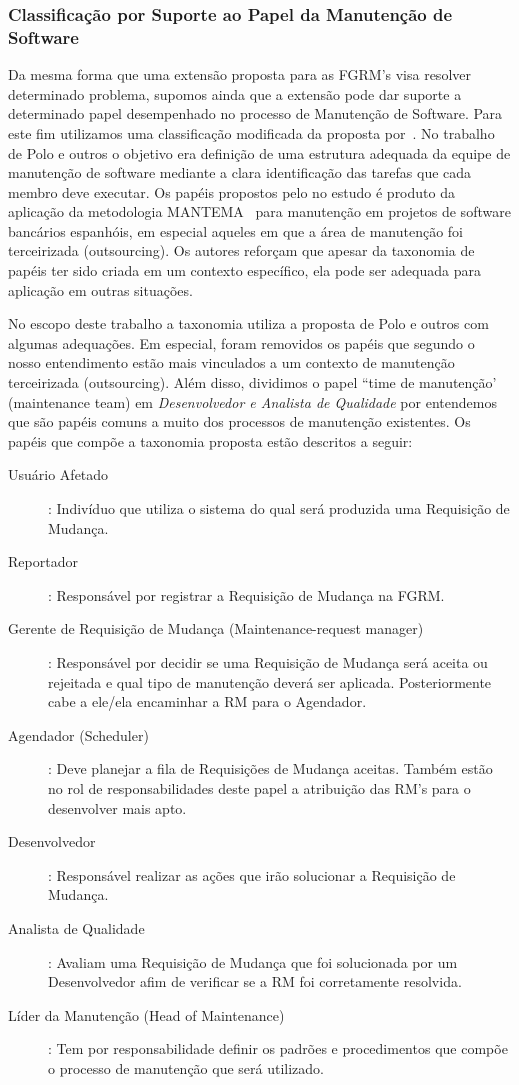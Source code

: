 \subsubsection{Classificação por Suporte ao Papel da Manutenção de Software}
\label{subsubsec:map-esquema-suporte-papel-man}

Da mesma forma que uma extensão proposta para as FGRM's visa resolver
determinado problema, supomos ainda que a extensão pode dar suporte a
determinado papel desempenhado no processo de Manutenção de Software. Para este
fim utilizamos uma classificação modificada da proposta por~\cite{Polo1999}. No
trabalho de Polo e outros o objetivo era definição de uma estrutura adequada da
equipe de manutenção de software mediante a clara identificação das tarefas que
cada membro deve executar. Os papéis propostos pelo no estudo é produto da
aplicação da metodologia MANTEMA~\cite{756695} para manutenção em projetos de
software bancários espanhóis, em especial aqueles em que a área de manutenção
foi terceirizada (outsourcing). Os autores reforçam que apesar da taxonomia de
papéis ter sido criada em um contexto específico, ela pode ser adequada para
aplicação em outras situações.

No escopo deste trabalho a taxonomia utiliza a proposta de Polo e outros com
algumas adequações. Em especial, foram removidos os papéis que segundo o nosso
entendimento estão mais vinculados a um contexto de manutenção terceirizada
(outsourcing). Além disso, dividimos o papel ``time de manutenção' (maintenance
team) em \textit{Desenvolvedor e Analista de Qualidade} por entendemos que são
papéis comuns a muito dos processos de manutenção existentes. Os papéis que
compõe a taxonomia proposta estão descritos a seguir:

\begin{description} 
	\item[Usuário Afetado]: Indivíduo que utiliza o sistema do
		qual será produzida uma Requisição de Mudança. 
   	\item[Reportador]:
		Responsável por registrar a Requisição de Mudança na FGRM\@.
	\item[Gerente de Requisição de Mudança (Maintenance-request manager)]:
		Responsável por decidir se uma Requisição de Mudança será aceita ou
		rejeitada e qual tipo de manutenção deverá ser aplicada. Posteriormente
		cabe a ele/ela encaminhar a RM para o Agendador. 
   	\item[Agendador
		(Scheduler)]: Deve planejar a fila de Requisições de Mudança aceitas.
		Também estão no rol de responsabilidades deste papel a atribuição das
		RM's para o desenvolver mais apto.
  	\item[Desenvolvedor]: Responsável
		realizar as ações que irão solucionar a Requisição de Mudança.
	\item[Analista de Qualidade]: Avaliam uma Requisição de Mudança que foi
		solucionada por um Desenvolvedor afim de verificar se a RM foi
		corretamente resolvida.
  	\item[Líder da Manutenção (Head of
		Maintenance)]: Tem por responsabilidade definir os padrões e
		procedimentos que compõe o processo de manutenção que será utilizado.
\end{description}

